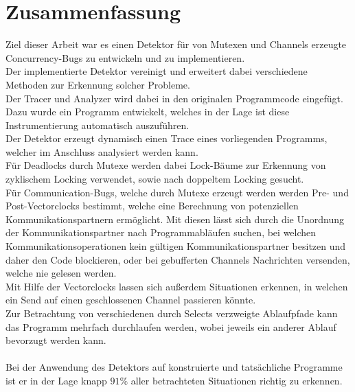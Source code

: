 \chapter{Zusammenfassung}\label{chap:conclusion}
Ziel dieser Arbeit war es einen Detektor für von Mutexen 
und Channels erzeugte Concurrency-Bugs zu entwickeln und zu implementieren.\\
Der implementierte Detektor vereinigt und erweitert dabei verschiedene Methoden 
zur Erkennung solcher Probleme.\\
Der Tracer und Analyzer wird dabei in den originalen Programmcode eingefügt.
Dazu wurde ein Programm entwickelt, welches in der Lage ist diese Instrumentierung
automatisch auszuführen.\\
Der Detektor erzeugt dynamisch einen Trace 
eines vorliegenden Programms, welcher im Anschluss analysiert werden kann.\\
Für Deadlocks durch Mutexe werden dabei Lock-Bäume zur Erkennung von zyklischem 
Locking verwendet, sowie nach doppeltem Locking gesucht.\\
Für Communication-Bugs, welche durch Mutexe erzeugt werden
werden Pre- und Post-Vectorclocks bestimmt, welche eine Berechnung
von potenziellen Kommunikationspartnern ermöglicht. Mit diesen lässt sich 
durch die Unordnung der Kommunikationspartner nach Programmabläufen suchen, 
bei welchen Kommunikationsoperationen kein gültigen Kommunikationspartner 
besitzen und daher den Code blockieren, oder bei gebufferten Channels 
Nachrichten versenden, welche nie gelesen werden. \\
Mit Hilfe der Vectorclocks lassen sich außerdem Situationen erkennen, 
in welchen ein Send auf einen geschlossenen Channel passieren könnte.\\
Zur Betrachtung von verschiedenen durch Selects verzweigte Ablaufpfade
kann das Programm mehrfach durchlaufen werden, wobei jeweils ein 
anderer Ablauf bevorzugt werden kann.\\\\
Bei der Anwendung des Detektors auf konstruierte und tatsächliche Programme 
ist er in der Lage knapp $91\%$ aller betrachteten 
Situationen richtig zu erkennen. 